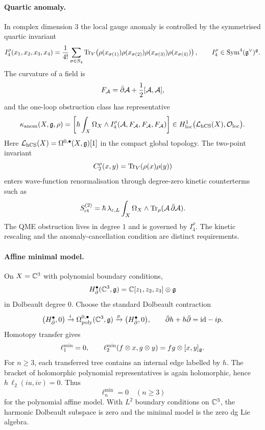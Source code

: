 \paragraph{Quartic anomaly.}
In complex dimension \(3\) the local gauge anomaly is controlled by the
symmetrised quartic invariant
\[
  I_4^\rho(x_1,x_2,x_3,x_4)
  =
  \frac{1}{4!}
  \sum_{\sigma\in S_4}
  \mathrm{Tr}_V\!\left(
    \rho(x_{\sigma(1)})\rho(x_{\sigma(2)})
    \rho(x_{\sigma(3)})\rho(x_{\sigma(4)})
  \right),
  \qquad
  I_4^\rho\in\mathrm{Sym}^4(\mathfrak g^\vee)^\mathfrak g .
\]
The curvature of a field is
\[
  F_\mathcal A=\bar\partial\mathcal A+\frac12[\mathcal A,\mathcal A],
\]
and the one-loop obstruction class has representative
\[
  \kappa_{\mathrm{anom}}(X,\mathfrak g,\rho)
  =
  \left[
    \hbar\int_X\Omega_X\wedge
    I_4^\rho(\mathcal A,F_\mathcal A,F_\mathcal A,F_\mathcal A)
  \right]
  \in
  H^1_{\mathrm{loc}}\bigl(\mathcal L_{\mathrm{hCS}}(X),\mathcal O_{\mathrm{loc}}\bigr).
\]
Here \(\mathcal L_{\mathrm{hCS}}(X)=\Omega^{0,\bullet}(X,\mathfrak g)[1]\) in the compact
global topology.
The two-point invariant
\[
  C_2^\rho(x,y)=\mathrm{Tr}_V(\rho(x)\rho(y))
\]
enters wave-function renormalisation through degree-zero kinetic
counterterms such as
\[
  S_{\mathrm{ct}}^{(2)}
  =
  \hbar\,\lambda_{\varepsilon,L}
  \int_X\Omega_X\wedge\mathrm{Tr}_\rho(\mathcal A\,\bar\partial\mathcal A).
\]
The QME obstruction lives in degree \(1\) and is governed by
\(I_4^\rho\).  The kinetic rescaling and the anomaly-cancellation
condition are distinct requirements.

\paragraph{Affine minimal model.}
On \(X=\mathbb C^3\) with polynomial boundary conditions,
\[
  H^\bullet_{\bar\partial}(\mathbb C^3,\mathfrak g)
  =
  \mathbb C[z_1,z_2,z_3]\otimes\mathfrak g
\]
in Dolbeault degree \(0\).  Choose the standard Dolbeault contraction
\[
  \bigl(H^\bullet_{\bar\partial},0\bigr)
  \xrightarrow{i}
  \Omega^{0,\bullet}_{\mathrm{poly}}(\mathbb C^3,\mathfrak g)
  \xrightarrow{p}
  \bigl(H^\bullet_{\bar\partial},0\bigr),
  \qquad
  \bar\partial h+h\bar\partial=\mathrm{id}-ip .
\]
Homotopy transfer gives
\[
  \ell_1^{\min}=0,\qquad
  \ell_2^{\min}(f\otimes x,g\otimes y)=fg\otimes[x,y]_\mathfrak g .
\]
For \(n\geq3\), each transferred tree contains an internal edge labelled
by \(h\).  The bracket of holomorphic polynomial representatives is
again holomorphic, hence \(h\,\ell_2(iu,iv)=0\).  Thus
\[
  \ell_n^{\min}=0\quad(n\geq3)
\]
for the polynomial affine model.  With \(L^2\) boundary conditions on
\(\mathbb C^3\), the harmonic Dolbeault subspace is zero and the minimal model
is the zero dg Lie algebra.

